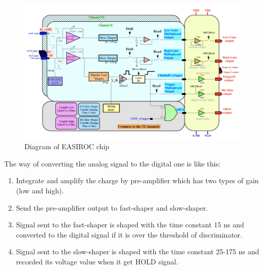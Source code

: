 \begin{figure}[H]
\begin{center}
\includegraphics[width = 13.0cm, bb= 0 0 1167 735]{5.png}
\end{center}
\caption{Diagram of EASIROC chip}
\label{fig:}
\end{figure}

The way of converting the analog signal to the digital one is like this:
\begin{enumerate}
\item Integrate and amplify the charge by pre-amplifier which has two types of gain (low and high).
\item Send the pre-amplifier output to fast-shaper and slow-shaper.
\item Signal sent to the fast-shaper is shaped with the time constant 15 ns and converted to the digital signal if it is over the threshold of discriminator.
\item Signal sent to the slow-shaper is shaped with the time constant 25-175 ns and recorded its voltage value when it get HOLD signal.
\end{enumerate}

